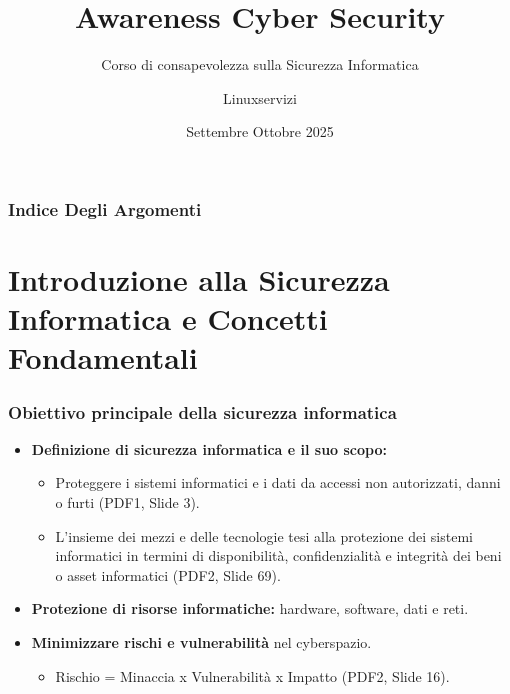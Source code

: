 \documentclass{beamer}
\title{Awareness Cyber Security}
\subtitle{Corso di consapevolezza sulla Sicurezza Informatica}
\author{Linuxservizi}
\institute{www.corsilinux.it}
\date{Settembre Ottobre 2025}
\begin{document}
\begin{frame}
  \titlepage
\end{frame}

\begin{frame}
  \frametitle{Indice Degli Argomenti}
  \tableofcontents
\end{frame}

\section{Introduzione alla Sicurezza Informatica e Concetti Fondamentali}

\begin{frame}
  \frametitle{Obiettivo principale della sicurezza informatica}
  \begin{itemize}
    \item \textbf{Definizione di sicurezza informatica e il suo scopo:}
    \begin{itemize}
        \item Proteggere i sistemi informatici e i dati da accessi non autorizzati, danni o furti (PDF1, Slide 3).
        \item L'insieme dei mezzi e delle tecnologie tesi alla protezione dei sistemi informatici in termini di disponibilità, confidenzialità e integrità dei beni o asset informatici (PDF2, Slide 69).
    \end{itemize}
    \item \textbf{Protezione di risorse informatiche:} hardware, software, dati e reti.
    \item \textbf{Minimizzare rischi e vulnerabilità} nel cyberspazio.
    \begin{itemize}
        \item Rischio = Minaccia x Vulnerabilità x Impatto (PDF2, Slide 16).
    \end{itemize}
  \end{itemize}
\end{frame}
\end{document}
